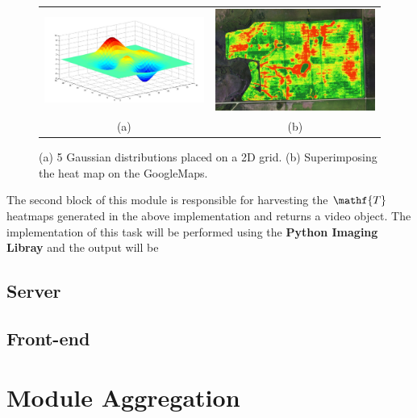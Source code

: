 \documentclass{article}
\begin{document}
\begin{figure}[!htbp]
\begin{center}
\begin{tabular}{c c}
\includegraphics[width=0.45\linewidth]{Images/multipleGaus.jpg}&
\includegraphics[width=0.45\linewidth]{Images/HeatMap.jpg}\\
(a) & (b)
\end{tabular}
\end{center}
\vspace{-0.15in}
\caption{\label{fig:Analytics} {\footnotesize (a) 5 Gaussian distributions placed on a 2D grid. (b) Superimposing the heat map on the GoogleMaps. }}
\end{figure}

The second block of this module is responsible for harvesting the $\mathf{T}$ heatmaps generated in the above implementation and returns a video object. The implementation of this task will be performed using the \textbf{Python Imaging Libray} and the output will be 
\subsection{Server}

\subsection{Front-end}





\section{Module Aggregation}
\end{document}
